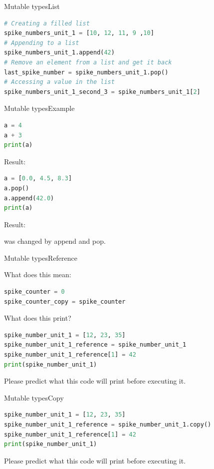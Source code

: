 \documentclass[aspectratio=169]{beamer}
\begin{document}
\begin{frame}[fragile]{Mutable types}{List}
\begin{lstlisting}[language=Python, frame=single]
# Creating a filled list
spike_numbers_unit_1 = [10, 12, 11, 9 ,10]
# Appending to a list
spike_numbers_unit_1.append(42)
# Remove an element from a list and get it back
last_spike_number = spike_numbers_unit_1.pop()
# Accessing a value in the list
spike_numbers_unit_1_second_3 = spike_numbers_unit_1[2]
\end{lstlisting}
\end{frame}

\begin{frame}[fragile]{Mutable types}{Example}
\begin{lstlisting}[language=Python, frame=single]
a = 4
a + 3
print(a)
\end{lstlisting}

Result: \pause {}

\pause

\begin{lstlisting}[language=Python, frame=single]
a = [0.0, 4.5, 8.3]
a.pop()
a.append(42.0)
print(a)
\end{lstlisting}

Result: \pause \textquote{[0.0, 4.5, 8.3]}

\pause
{} was changed by append and pop.

\end{frame}

\begin{frame}[fragile]{Mutable types}{Reference}

What does this mean:
\begin{lstlisting}[language=Python, frame=single]
spike_counter = 0
spike_counter_copy = spike_counter
\end{lstlisting}

\pause

What does this print?

\begin{lstlisting}[language=Python, frame=single]
spike_number_unit_1 = [12, 23, 35]
spike_number_unit_1_reference = spike_number_unit_1
spike_number_unit_1_reference[1] = 42
print(spike_number_unit_1)
\end{lstlisting}

Please predict what this code will print before executing it.

\end{frame}

\begin{frame}[fragile]{Mutable types}{Copy}

\begin{lstlisting}[language=Python, frame=single]
spike_number_unit_1 = [12, 23, 35]
spike_number_unit_1_reference = spike_number_unit_1.copy()
spike_number_unit_1_reference[1] = 42
print(spike_number_unit_1)
\end{lstlisting}

Please predict what this code will print before executing it.

\end{frame}
\end{document}

